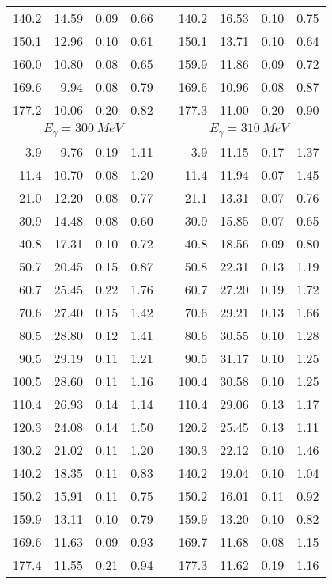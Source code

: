 \begin{table}[htbp]
\begin{center}
\begin{tabular}{|r|r|c|c|l|r|r|c|c|}
140.2 & 14.59 &  0.09 &  0.66 & & 140.2 & 16.53 &  0.10 &  0.75 \\ 
150.1 & 12.96 &  0.10 &  0.61 & & 150.1 & 13.71 &  0.10 &  0.64 \\ 
160.0 & 10.80 &  0.08 &  0.65 & & 159.9 & 11.86 &  0.09 &  0.72 \\ 
169.6 &  9.94 &  0.08 &  0.79 & & 169.6 & 10.96 &  0.08 &  0.87 \\ 
177.2 & 10.06 &  0.20 &  0.82 & & 177.3 & 11.00 &  0.20 &  0.90 \\ 
\hline 
\hline 
\multicolumn{4}{|c|}{ $E_{\gamma}=300~MeV$} & & 
\multicolumn{4}{c|}{ $E_{\gamma}=310~MeV$} \\ 
\cline{1-4} 
\cline{6-9} 
  3.9 &  9.76 &  0.19 &  1.11 & &   3.9 & 11.15 &  0.17 &  1.37 \\ 
 11.4 & 10.70 &  0.08 &  1.20 & &  11.4 & 11.94 &  0.07 &  1.45 \\ 
 21.0 & 12.20 &  0.08 &  0.77 & &  21.1 & 13.31 &  0.07 &  0.76 \\ 
 30.9 & 14.48 &  0.08 &  0.60 & &  30.9 & 15.85 &  0.07 &  0.65 \\ 
 40.8 & 17.31 &  0.10 &  0.72 & &  40.8 & 18.56 &  0.09 &  0.80 \\ 
 50.7 & 20.45 &  0.15 &  0.87 & &  50.8 & 22.31 &  0.13 &  1.19 \\ 
 60.7 & 25.45 &  0.22 &  1.76 & &  60.7 & 27.20 &  0.19 &  1.72 \\ 
 70.6 & 27.40 &  0.15 &  1.42 & &  70.6 & 29.21 &  0.13 &  1.66 \\ 
 80.5 & 28.80 &  0.12 &  1.41 & &  80.6 & 30.55 &  0.10 &  1.28 \\ 
 90.5 & 29.19 &  0.11 &  1.21 & &  90.5 & 31.17 &  0.10 &  1.25 \\ 
100.5 & 28.60 &  0.11 &  1.16 & & 100.4 & 30.58 &  0.10 &  1.25 \\ 
110.4 & 26.93 &  0.14 &  1.14 & & 110.4 & 29.06 &  0.13 &  1.17 \\ 
120.3 & 24.08 &  0.14 &  1.50 & & 120.2 & 25.45 &  0.13 &  1.11 \\ 
130.2 & 21.02 &  0.11 &  1.20 & & 130.3 & 22.12 &  0.10 &  1.46 \\ 
140.2 & 18.35 &  0.11 &  0.83 & & 140.2 & 19.04 &  0.10 &  1.04 \\ 
150.2 & 15.91 &  0.11 &  0.75 & & 150.2 & 16.01 &  0.11 &  0.92 \\ 
159.9 & 13.11 &  0.10 &  0.79 & & 159.9 & 13.20 &  0.10 &  0.82 \\ 
169.6 & 11.63 &  0.09 &  0.93 & & 169.7 & 11.68 &  0.08 &  1.15 \\ 
177.4 & 11.55 &  0.21 &  0.94 & & 177.3 & 11.62 &  0.19 &  1.16 \\ 
\cline{1-4} 
\cline{6-9} 
\end{tabular} 

\end{center} 
\end{table}
